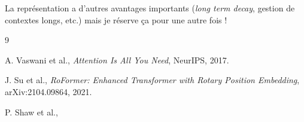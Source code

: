 \documentclass{article}
\begin{document}
La représentation a d'autres avantages importants (\textit{long term decay}, gestion de contextes longs, etc.) mais je réserve ça pour une autre fois !



\begin{thebibliography}{9}

A. Vaswani et al.,
\textit{Attention Is All You Need},
NeurIPS, 2017.

J. Su et al.,
\textit{RoFormer: Enhanced Transformer with Rotary Position Embedding},
arXiv:2104.09864, 2021.

P. Shaw et al.,

\end{thebibliography}
\end{document}

